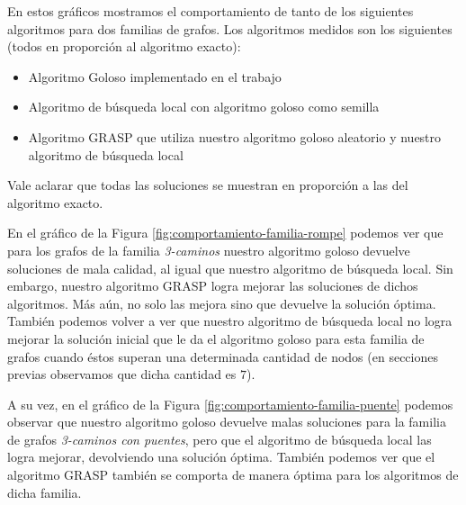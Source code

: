 En estos gráficos mostramos el comportamiento de tanto de los siguientes algoritmos para dos familias de grafos. Los algoritmos medidos son los siguientes (todos en proporción al algoritmo exacto):

\begin{itemize}
 \item Algoritmo Goloso implementado en el trabajo
 \item Algoritmo de búsqueda local con algoritmo goloso como semilla
 \item Algoritmo GRASP que utiliza nuestro algoritmo goloso aleatorio y nuestro algoritmo de búsqueda local
\end{itemize}

Vale aclarar que todas las soluciones se muestran en proporción a las del algoritmo exacto.

En el gráfico de la Figura \ref{fig:comportamiento-familia-rompe} podemos ver que para los grafos de la familia \emph{3-caminos} nuestro algoritmo goloso devuelve soluciones de mala calidad, al igual que nuestro algoritmo de búsqueda local. Sin embargo, nuestro algoritmo GRASP logra mejorar las soluciones de dichos algoritmos. Más aún, no solo las mejora sino que devuelve la solución óptima. También podemos volver a ver que nuestro algoritmo de búsqueda local no logra mejorar la solución inicial que le da el algoritmo goloso para esta familia de grafos cuando éstos superan una determinada cantidad de nodos (en secciones previas observamos que dicha cantidad es $7$).

A su vez, en el gráfico de la Figura \ref{fig:comportamiento-familia-puente} podemos observar que nuestro algoritmo goloso devuelve malas soluciones para la familia de grafos \emph{3-caminos con puentes}, pero que el algoritmo de búsqueda local las logra mejorar, devolviendo una solución óptima. También podemos ver que el algoritmo GRASP también se comporta de manera óptima para los algoritmos de dicha familia.
